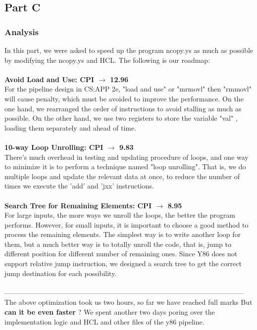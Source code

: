 \documentclass{article}
\begin{document}
\subsection{Part C}
\subsubsection{Analysis}
In this part, we were asked to speed up the program ncopy.ys 
as much as possible by modifying the ncopy.ys and HCL.
The following is our roadmap:\\
\\
\textbf{Avoid Load and Use: CPI $\rightarrow$ 12.96} \\
For the pipeline design in CS:APP 2e, "load and use" or "mrmovl" then "rmmovl" will cause penalty,
which must be avoided to improve the performance. On the one hand, we rearranged the order of 
instructions to avoid stalling as much as possible. On the other hand, we use two registers to store 
the variable "val" , loading them separately and ahead of time.\\
\\
\textbf{10-way Loop Unrolling:  CPI $\rightarrow$ 9.83} \\
There's much overhead in testing and updating procedure of loops, and one way to minimize it is to 
perform a technique named "loop unrolling". That is, we do multiple loops and update the relevant 
data at once, to reduce the number of times we execute the 'add' and 'jxx' instructions. \\
\\
\textbf{Search Tree for Remaining Elements:  CPI $\rightarrow$ 8.95} \\
For large inputs, the more ways we unroll the loops, the better the program performs. However, for 
small inputs, it is important to choose a good method to process the remaining elements. The simplest 
way is to write another loop for them, but a much better way is to totally unroll the code, that is, 
jump to different position for different number of remaining ones. Since Y86 does not support relative 
jump instruction, we designed a search tree to get the correct jump destination for each possibility.
\\
\\
--------------------------------------------------------------------------------------------------------\\
The above optimization took us two hours, so far we have reached full marks
But \textbf{can it be even faster} ?
We spent another two days poring over the implementation logic and HCL and other files of the y86 pipeline. 
\end{document}

